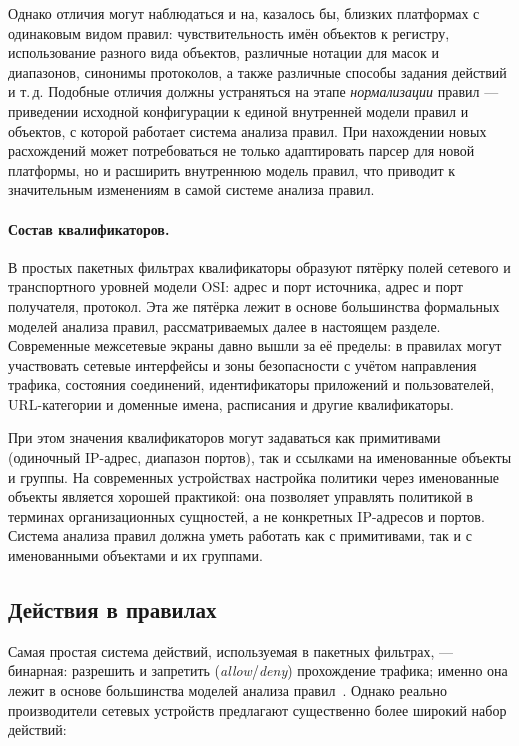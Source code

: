 Однако отличия могут наблюдаться и на, казалось бы, близких платформах с одинаковым видом правил: чувствительность имён объектов к регистру, использование разного вида объектов, различные нотации для масок и диапазонов, синонимы протоколов, а также различные способы задания действий и т.\,д. Подобные отличия должны устраняться на этапе \emph{нормализации} правил --- приведении исходной конфигурации к единой внутренней модели правил и объектов, с которой работает система анализа правил. При нахождении новых расхождений может потребоваться не только адаптировать парсер для новой платформы, но и расширить внутреннюю модель правил, что приводит к значительным изменениям в самой системе анализа правил.

\paragraph{Состав квалификаторов.} В простых пакетных фильтрах квалификаторы образуют пятёрку полей сетевого и транспортного уровней модели OSI: адрес и порт источника, адрес и порт получателя, протокол. Эта же пятёрка лежит в основе большинства формальных моделей анализа правил, рассматриваемых далее в настоящем разделе. Современные межсетевые экраны давно вышли за её пределы: в правилах могут участвовать сетевые интерфейсы и зоны безопасности с учётом направления трафика, состояния соединений, идентификаторы приложений и пользователей, URL-категории и доменные имена, расписания и другие квалификаторы.

При этом значения квалификаторов могут задаваться как примитивами (одиночный IP-адрес, диапазон портов), так и ссылками на именованные объекты и группы. На современных устройствах настройка политики через именованные объекты является хорошей практикой: она позволяет управлять политикой в терминах организационных сущностей, а не конкретных IP-адресов и портов. Система анализа правил должна уметь работать как с примитивами, так и с именованными объектами и их группами.

\subsection{Действия в правилах}
\label{sec:Section2:rules_actions}

Самая простая система действий, используемая в пакетных фильтрах, --- бинарная: разрешить и запретить (\emph{allow}/\emph{deny}) прохождение трафика; именно она лежит в основе большинства моделей анализа правил~\cite{al2003firewall,yuan2006fireman,liu2008firewall}. Однако реально производители сетевых устройств предлагают существенно более широкий набор действий:

